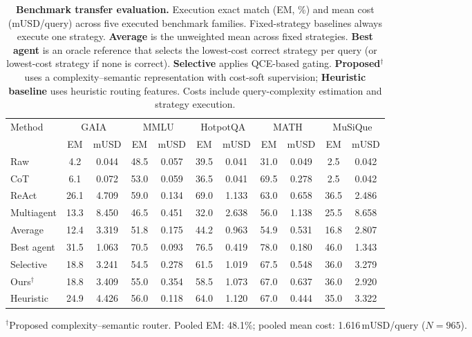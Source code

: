 \begin{table}[t]
  \centering
  \footnotesize
  \setlength{\tabcolsep}{4pt}
  \renewcommand{\arraystretch}{1.05}
  \caption{\textbf{Benchmark transfer evaluation.}
    Execution exact match (EM, \%) and mean cost (mUSD/query) across five executed benchmark families.
    Fixed-strategy baselines always execute one strategy.
    \textbf{Average} is the unweighted mean across fixed strategies.
    \textbf{Best agent} is an oracle reference that selects the lowest-cost correct strategy per query (or lowest-cost strategy if none is correct).
    \textbf{Selective} applies QCE-based gating.
    \textbf{Proposed}$^\dagger$ uses a complexity--semantic representation with cost-soft supervision;
    \textbf{Heuristic baseline} uses heuristic routing features.
    Costs include query-complexity estimation and strategy execution.}
  \label{tab:live-benchmark}
  \begin{tabular}{@{}l *{5}{cc}@{}}
    \toprule
    \multirow{2}{*}{Method} &
      \multicolumn{2}{c}{GAIA} &
      \multicolumn{2}{c}{MMLU} &
      \multicolumn{2}{c}{HotpotQA} &
      \multicolumn{2}{c}{MATH} &
      \multicolumn{2}{c}{MuSiQue} \\
    \cmidrule(lr){2-3}\cmidrule(lr){4-5}\cmidrule(lr){6-7}\cmidrule(lr){8-9}\cmidrule(lr){10-11}
    & EM & mUSD & EM & mUSD & EM & mUSD & EM & mUSD & EM & mUSD \\
    \midrule
    Raw        &  4.2 & 0.044 & 48.5 & 0.057 & 39.5 & 0.041 & 31.0 & 0.049 &  2.5 & 0.042 \\
    CoT        &  6.1 & 0.072 & 53.0 & 0.059 & 36.5 & 0.041 & 69.5 & 0.278 &  2.5 & 0.042 \\
    ReAct      & 26.1 & 4.709 & 59.0 & 0.134 & 69.0 & 1.133 & 63.0 & 0.658 & 36.5 & 2.486 \\
    Multiagent & 13.3 & 8.450 & 46.5 & 0.451 & 32.0 & 2.638 & 56.0 & 1.138 & 25.5 & 8.658 \\
    \midrule
    Average    & 12.4 & 3.319 & 51.8 & 0.175 & 44.2 & 0.963 & 54.9 & 0.531 & 16.8 & 2.807 \\
    Best agent & 31.5 & 1.063 & 70.5 & 0.093 & 76.5 & 0.419 & 78.0 & 0.180 & 46.0 & 1.343 \\
    Selective  & 18.8 & 3.241 & 54.5 & 0.278 & 61.5 & 1.019 & 67.5 & 0.548 & 36.0 & 3.279 \\
    \midrule
    Ours$^\dagger$ & 18.8 & 3.409 & 55.0 & 0.354 & 58.5 & 1.073 & 67.0 & 0.637 & 36.0 & 2.920 \\
    Heuristic  & 24.9 & 4.426 & 56.0 & 0.118 & 64.0 & 1.120 & 67.0 & 0.444 & 35.0 & 3.322 \\
    \bottomrule
  \end{tabular}
  \par\vspace{0.4ex}%
  \begin{minipage}{\linewidth}
    \centering\footnotesize
    $^\dagger$Proposed complexity--semantic router.
    Pooled EM: 48.1\%; pooled mean cost: 1.616\,mUSD/query ($N{=}965$).
  \end{minipage}
\end{table}

